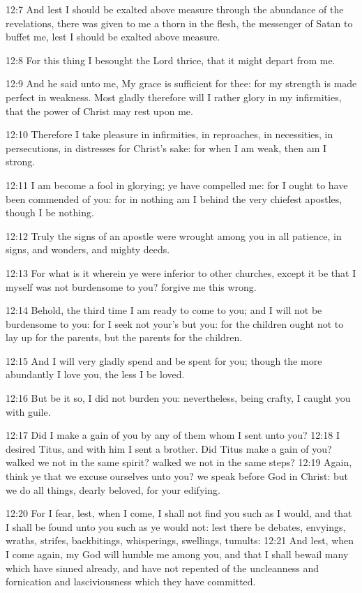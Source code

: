 12:7 And lest I should be exalted above measure through the abundance
of the revelations, there was given to me a thorn in the flesh, the
messenger of Satan to buffet me, lest I should be exalted above
measure.

12:8 For this thing I besought the Lord thrice, that it might depart
from me.

12:9 And he said unto me, My grace is sufficient for thee: for my
strength is made perfect in weakness. Most gladly therefore will I
rather glory in my infirmities, that the power of Christ may rest upon
me.

12:10 Therefore I take pleasure in infirmities, in reproaches, in
necessities, in persecutions, in distresses for Christ's sake: for
when I am weak, then am I strong.

12:11 I am become a fool in glorying; ye have compelled me: for I
ought to have been commended of you: for in nothing am I behind the
very chiefest apostles, though I be nothing.

12:12 Truly the signs of an apostle were wrought among you in all
patience, in signs, and wonders, and mighty deeds.

12:13 For what is it wherein ye were inferior to other churches,
except it be that I myself was not burdensome to you? forgive me this
wrong.

12:14 Behold, the third time I am ready to come to you; and I will not
be burdensome to you: for I seek not your's but you: for the children
ought not to lay up for the parents, but the parents for the children.

12:15 And I will very gladly spend and be spent for you; though the
more abundantly I love you, the less I be loved.

12:16 But be it so, I did not burden you: nevertheless, being crafty,
I caught you with guile.

12:17 Did I make a gain of you by any of them whom I sent unto you?
12:18 I desired Titus, and with him I sent a brother. Did Titus make a
gain of you? walked we not in the same spirit? walked we not in the
same steps?  12:19 Again, think ye that we excuse ourselves unto you?
we speak before God in Christ: but we do all things, dearly beloved,
for your edifying.

12:20 For I fear, lest, when I come, I shall not find you such as I
would, and that I shall be found unto you such as ye would not: lest
there be debates, envyings, wraths, strifes, backbitings, whisperings,
swellings, tumults: 12:21 And lest, when I come again, my God will
humble me among you, and that I shall bewail many which have sinned
already, and have not repented of the uncleanness and fornication and
lasciviousness which they have committed.

